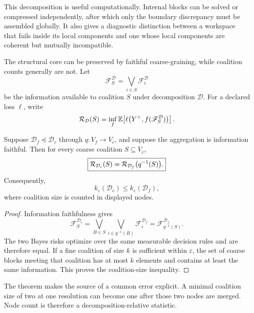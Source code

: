 This decomposition is useful computationally. Internal blocks can be solved
or compressed independently, after which only the boundary discrepancy must
be assembled globally. It also gives a diagnostic distinction between a
workspace that fails inside its local components and one whose local
components are coherent but mutually incompatible.


The structural core can be preserved by faithful coarse-graining, while
coalition counts generally are not. Let
\[
\mathscr F_S^{\mathcal D}
=
\bigvee_{i\in S}\mathscr F_i^{\mathcal D}
\]
be the information available to coalition \(S\) under decomposition
\(\mathcal D\). For a declared loss \(\ell\), write
\[
\mathcal R_{\mathcal D}(S)
=
\inf_f
\mathbb E\!\left[
\ell\bigl(Y^+,f(\mathscr F_S^{\mathcal D})\bigr)
\right].
\]

\begin{theorem}
\label{thm:risk-aggregation}
Suppose \(\mathcal D_f\preceq\mathcal D_c\) through
\(q:V_f\to V_c\), and suppose the aggregation is information faithful. Then
for every coarse coalition \(S\subseteq V_c\),
\[
\boxed{
\mathcal R_{\mathcal D_c}(S)
=
\mathcal R_{\mathcal D_f}\bigl(q^{-1}(S)\bigr).
}
\]
Consequently,
\[
k_\varepsilon(\mathcal D_c)
\leq
k_\varepsilon(\mathcal D_f),
\]
where coalition size is counted in displayed nodes.
\end{theorem}

\begin{proof}
Information faithfulness gives
\[
\mathscr F_S^{\mathcal D_c}
=
\bigvee_{B\in S}
\bigvee_{i\in q^{-1}(B)}
\mathscr F_i^{\mathcal D_f}
=
\mathscr F_{q^{-1}(S)}^{\mathcal D_f}.
\]
The two Bayes risks optimize over the same measurable decision rules and are
therefore equal. If a fine coalition of size \(k\) is sufficient within
\(\varepsilon\), the set of coarse blocks meeting that coalition has at most
\(k\) elements and contains at least the same information. This proves the
coalition-size inequality.
\end{proof}

The theorem makes the source of a common error explicit. A minimal coalition
size of two at one resolution can become one after those two nodes are merged.
Node count is therefore a decomposition-relative statistic.

